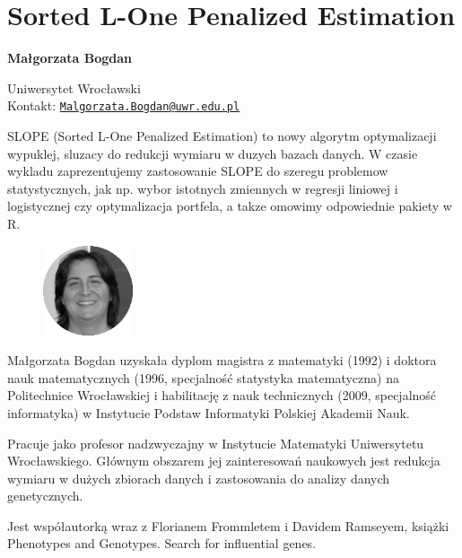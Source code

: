 \documentclass[\main/boa.tex]{subfiles}
\begin{document}
\section{Sorted L-One Penalized Estimation}


\begin{minipage}{0.915\textwidth}
	\centering
  {\bf \LARGE {} Małgorzata Bogdan}
\end{minipage}




\begin{affiliations}
\begin{minipage}{0.915\textwidth}
\centering
\large Uniwersytet Wrocławski  \\[1pt]
Kontakt: \href{mailto:Malgorzata.Bogdan@uwr.edu.pl}{\nolinkurl{Malgorzata.Bogdan@uwr.edu.pl}}\\
\end{minipage}
\end{affiliations}


SLOPE (Sorted L-One Penalized Estimation) to nowy algorytm optymalizacji wypuklej, sluzacy do redukcji wymiaru w duzych bazach danych. W czasie wykladu zaprezentujemy zastosowanie SLOPE do szeregu problemow statystycznych, jak np. wybor istotnych zmiennych w regresji liniowej i logistycznej czy optymalizacja portfela, a takze omowimy odpowiednie pakiety w R. 

\bio
\begin{figure}
    \includegraphics[width=100px]{img/guests/czarno_biale/mbogdan-crop.png}
\end{figure} 
Małgorzata Bogdan uzyskała dyplom magistra z matematyki (1992) i doktora nauk matematycznych (1996, specjalność statystyka matematyczna) na Politechnice Wrocławskiej i habilitację z nauk technicznych (2009, specjalność informatyka) w Instytucie Podstaw Informatyki Polskiej Akademii Nauk.

Pracuje jako profesor nadzwyczajny w Instytucie Matematyki Uniwersytetu Wrocławskiego. Głównym obszarem jej zainteresowań naukowych jest redukcja wymiaru w dużych zbiorach danych i zastosowania do analizy danych genetycznych.

Jest współautorką wraz z Florianem Frommletem i Davidem Ramseyem, książki Phenotypes and Genotypes. Search for influential genes.
\end{document}

